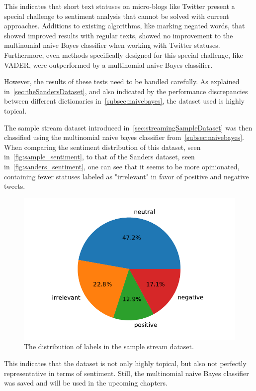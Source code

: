 This indicates that short text statuses on micro-blogs like Twitter present a special challenge to sentiment analysis
that cannot be solved with current approaches.
Additions to existing algorithms, like marking negated words, that showed improved results with regular texts,
showed no improvement to the multinomial naive Bayes classifier when working with Twitter statuses.
Furthermore, even methods specifically designed for this special challenge, like VADER,
were outperformed by a multinomial naive Bayes classifier.
\par
However, the results of these tests need to be handled carefully.
As explained in~\autoref{sec:theSandersDataset},
and also indicated by the performance discrepancies between different dictionaries in~\autoref{subsec:naivebayes},
the dataset used is highly topical.
\par
The sample stream dataset introduced in~\autoref{sec:streamingSampleDataset} was then classified using the multinomial naive bayes classifier from~\autoref{subsec:naivebayes}.
When comparing the sentiment distribution of this dataset, seen in~\autoref{fig:sample_sentiment},
to that of the Sanders dataset, seen in~\autoref{fig:sanders_sentiment},
one can see that it seems to be more opinionated,
containing fewer statuses labeled as "irrelevant" in favor of positive and negative tweets.

\begin{figure}
    \centering
    \caption{The distribution of labels in the sample stream dataset.}
    \label{fig:sample_sentiment}
    \includegraphics[width=12cm]{../figures/sample_sentiment.pdf}
\end{figure}

This indicates that the dataset is not only highly topical, but also not perfectly representative in terms of sentiment.
Still, the multinomial naive Bayes classifier was saved and will be used in the upcoming chapters.
